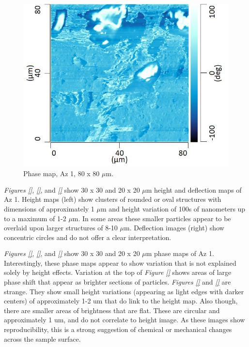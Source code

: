 \begin{figure}[H]
\centering
  \includegraphics[width=.45\textwidth]{Az1_tapping_mode_240521_phase_1}
\caption[Phase map, Az 1]{Phase map, Az 1, 80 x 80 $\mu$m.}
\label{fig:afm_az1_phase_1}
\end{figure}

\textit{Figures \ref{}}, \textit{\ref{}}, and \textit{\ref{}} show 30 x 30 and 20 x 20 $\mu$m height and deflection maps of Az 1. Height maps (left) show clusters of rounded or oval structures with dimensions of approximately 1 $\mu$m and height variation of 100s of nanometers up to a maximum of 1-2 $\mu$m. In some areas these smaller particles appear to be overlaid upon larger structures of 8-10 $\mu$m. Deflection images (right) show concentric circles and do not offer a clear interpretation.


\textit{Figures \ref{}}, \textit{\ref{}}, and \textit{\ref{}} show 30 x 30 and 20 x 20 $\mu$m phase maps of Az 1. Interestingly, these phase maps appear to show variation that is not explained solely by height effects. Variation at the top of \textit{Figure \ref{}} shows areas of large phase shift that appear as brighter sections of particles. \textit{Figures \ref{}} and \textit{\ref{}} are strange. They show small height variations (appearing as light edges with darker centers) of approximately 1-2 um that do link to the height map. Also though, there are smaller areas of brightness that are flat. These are circular and approximately 1 um, and do not correlate to height image. As these images show reproducibility, this is a strong suggestion of chemical or mechanical changes across the sample surface. 


